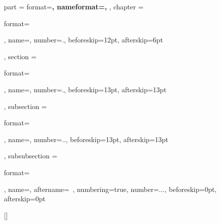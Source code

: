 

\ctexset
{
    part =
    {
        format=\centering{}\bfseries,
        nameformat=\centering\heiti\fontsize{48}{48}\bfseries,
    },
    chapter =
    {
        format=\raggedright{},
        name={},
        number=.,
        beforeskip=12pt,
        afterskip=6pt
    },
    section =
    {
        format=\raggedright\heiti {},
        name={},
        number=.,
        beforeskip=13pt,
        afterskip=13pt
    },
    subsection =
    {
        format=\raggedright{},
        name={},
        number=..,
        beforeskip=13pt,
        afterskip=13pt
    },
    subsubsection =
    {
        format=\raggedright{},
        name={},
        aftername=~,
        numbering=true,
        number=...,
        beforeskip=0pt,
        afterskip=0pt
    }
}

\makeatletter
{}
\makeatother

\renewcommand{\contentsname}{ \zihao{2}\heiti 目\ \ 录\vspace{1em}}

[\bibname]{
}
